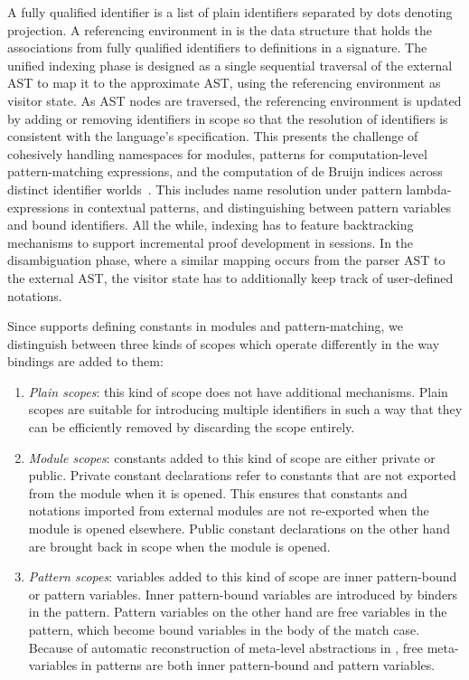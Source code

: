 A fully qualified identifier is a list of plain identifiers separated by dots denoting projection.
A referencing environment in \Beluga is the data structure that holds the associations from fully qualified identifiers to definitions in a signature.
The unified indexing phase is designed as a single sequential traversal of the external \ac{AST} to map it to the approximate \ac{AST}, using the referencing environment as visitor state.
As \ac{AST} nodes are traversed, the referencing environment is updated by adding or removing identifiers in scope so that the resolution of identifiers is consistent with the language's specification.
This presents the challenge of cohesively handling namespaces for modules, patterns for computation-level pattern-matching expressions, and the computation of de Bruijn indices across distinct identifier worlds~\cite{ferreira2012compiler}.
This includes name resolution under pattern lambda-expressions in contextual \LF patterns, and distinguishing between pattern variables and bound identifiers.
All the while, indexing has to feature backtracking mechanisms to support incremental proof development in \Harpoon sessions.
In the disambiguation phase, where a similar mapping occurs from the parser \ac{AST} to the external \ac{AST}, the visitor state has to additionally keep track of user-defined notations.

Since \Beluga supports defining constants in modules and pattern-matching, we distinguish between three kinds of scopes which operate differently in the way bindings are added to them:
\begin{enumerate}
\item
\textit{Plain scopes}: this kind of scope does not have additional mechanisms.
Plain scopes are suitable for introducing multiple identifiers in such a way that they can be efficiently removed by discarding the scope entirely.
\item
\textit{Module scopes}: constants added to this kind of scope are either private or public.
Private constant declarations refer to constants that are not exported from the module when it is opened.
This ensures that constants and notations imported from external modules are not re-exported when the module is opened elsewhere.
Public constant declarations on the other hand are brought back in scope when the module is opened.
\item
\textit{Pattern scopes}: variables added to this kind of scope are inner pattern-bound or pattern variables.
Inner pattern-bound variables are introduced by binders in the pattern.
Pattern variables on the other hand are free variables in the pattern, which become bound variables in the body of the match case.
Because of automatic reconstruction of meta-level abstractions in \Beluga, free meta-variables in patterns are both inner pattern-bound and pattern variables.
\end{enumerate}

